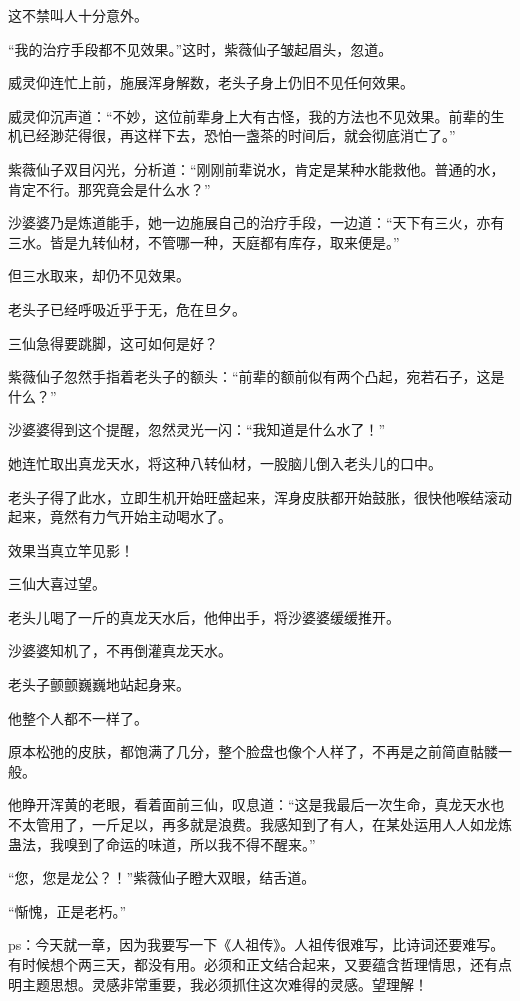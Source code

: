 \begin{this_body}
这不禁叫人十分意外。

“我的治疗手段都不见效果。”这时，紫薇仙子皱起眉头，忽道。

威灵仰连忙上前，施展浑身解数，老头子身上仍旧不见任何效果。

威灵仰沉声道：“不妙，这位前辈身上大有古怪，我的方法也不见效果。前辈的生机已经渺茫得很，再这样下去，恐怕一盏茶的时间后，就会彻底消亡了。”

紫薇仙子双目闪光，分析道：“刚刚前辈说水，肯定是某种水能救他。普通的水，肯定不行。那究竟会是什么水？”

沙婆婆乃是炼道能手，她一边施展自己的治疗手段，一边道：“天下有三火，亦有三水。皆是九转仙材，不管哪一种，天庭都有库存，取来便是。”

但三水取来，却仍不见效果。

老头子已经呼吸近乎于无，危在旦夕。

三仙急得要跳脚，这可如何是好？

紫薇仙子忽然手指着老头子的额头：“前辈的额前似有两个凸起，宛若石子，这是什么？”

沙婆婆得到这个提醒，忽然灵光一闪：“我知道是什么水了！”

她连忙取出真龙天水，将这种八转仙材，一股脑儿倒入老头儿的口中。

老头子得了此水，立即生机开始旺盛起来，浑身皮肤都开始鼓胀，很快他喉结滚动起来，竟然有力气开始主动喝水了。

效果当真立竿见影！

三仙大喜过望。

老头儿喝了一斤的真龙天水后，他伸出手，将沙婆婆缓缓推开。

沙婆婆知机了，不再倒灌真龙天水。

老头子颤颤巍巍地站起身来。

他整个人都不一样了。

原本松弛的皮肤，都饱满了几分，整个脸盘也像个人样了，不再是之前简直骷髅一般。

他睁开浑黄的老眼，看着面前三仙，叹息道：“这是我最后一次生命，真龙天水也不太管用了，一斤足以，再多就是浪费。我感知到了有人，在某处运用人人如龙炼蛊法，我嗅到了命运的味道，所以我不得不醒来。”

“您，您是龙公？！”紫薇仙子瞪大双眼，结舌道。

“惭愧，正是老朽。”

ps：今天就一章，因为我要写一下《人祖传》。人祖传很难写，比诗词还要难写。有时候想个两三天，都没有用。必须和正文结合起来，又要蕴含哲理情思，还有点明主题思想。灵感非常重要，我必须抓住这次难得的灵感。望理解！

\end{this_body}

